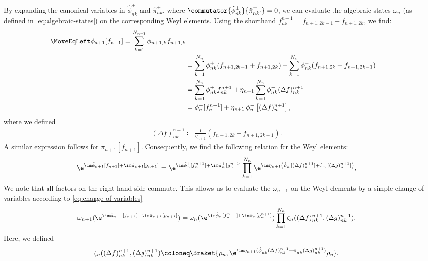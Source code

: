By expanding the canonical variables in $\hat\phi_{nk}^\pm$ and $\hat\pi_{nk}^\pm$, where $\commutator{\hat\phi_{nk}^\pm}{\hat\pi_{nk'}^\mp} = 0$, we can evaluate the algebraic states $\omega_n$ (as defined in \cref{eq:algebraic-states}) on the corresponding Weyl elements.
Using the shorthand $f_{nk}^{n+1} = f_{n+1,2k-1}+f_{n+1,2k}$, we find:
\begin{align}
    \MoveEqLeft \phi_{n+1}[f_{n+1}]
         = \sum_{k=1}^{N_{n+1}} \phi_{n+1,k}f_{n+1,k} \nonumber \\
        &= \sum_{k=1}^{N_n}\phi_{nk}^+(f_{n+1,2k-1}+f_{n+1,2k}) + \sum_{k=1}^{N_n} \phi_{nk}^-(f_{n+1,2k}-f_{n+1,2k-1}) \nonumber \\
        &= \sum_{k=1}^{N_n}\phi_{nk}^+ f_{nk}^{n+1} + \eta_{n+1} \sum_{k=1}^{N_n} \phi_{nk}^- (\Delta f)^{n+1}_{n k} \nonumber \\
        &= \phi_n^+[f_n^{n+1}] + \eta_{n+1} \,\phi_{n}^- \left[ (\Delta f)^{n+1}_{n} \right],
\end{align}
where we defined
\begin{align}
    (\Delta f)^{n+1}_{n k} \coloneq \frac{1}{\eta_{n+1}} \left( f_{n+1, 2k} - f_{n+1,2k-1}\right).
\end{align}
A similar expression follows for $\pi_{n+1}[f_{n+1}]$.
Consequently, we find the following relation for the Weyl elements:
\begin{align}
    \e^{\im\hat\phi_{n+1}[f_{n+1}] + \im\hat\pi_{n+1}[g_{n+1}]}
        = \e^{\im\hat\phi_n^+[f_n^{n+1}] + \im\hat\pi_n^+[g_n^{n+1}]} \prod_{k=1}^{N_n} \e^{\im\eta_{n+1}\left(\hat\phi_{n}^- [(\Delta f)^{n+1}_{n }] + \hat\pi_{n}^- [(\Delta g)^{n+1}_{n }]\right)},
\end{align}
We note that all factors on the right hand side commute.
This allows us to evaluate the $\omega_{n+1}$ on the Weyl elements by a simple change of variables according to \cref{eq:change-of-variables}:
\begin{align}
    \omega_{n+1}(\e^{\im\hat\phi_{n+1}[f_{n+1}] + \im\hat\pi_{n+1}[g_{n+1}]})
        = \omega_n(\e^{\im\hat\phi_n[f_n^{n+1}] + \im\hat\pi_n[g_n^{n+1}]}) \prod_{k=1}^{N_n} \zeta_{n}((\Delta f)^{n+1}_{nk}, (\Delta g)^{n+1}_{nk}) .
\end{align}
Here, we defined
\begin{equation} \label{def:zeta_n}
    \zeta_{n}((\Delta f)^{n+1}_{nk}, (\Delta g)^{n+1}_{nk}) \coloneq \Braket{\rho_n, \e^{\im \eta_{n+1} (\hat\phi_{nk}^- (\Delta f)^{n+1}_{nk} + \hat\pi_{nk}^-(\Delta g)^{n+1}_{nk})} \rho_n}.
\end{equation}
